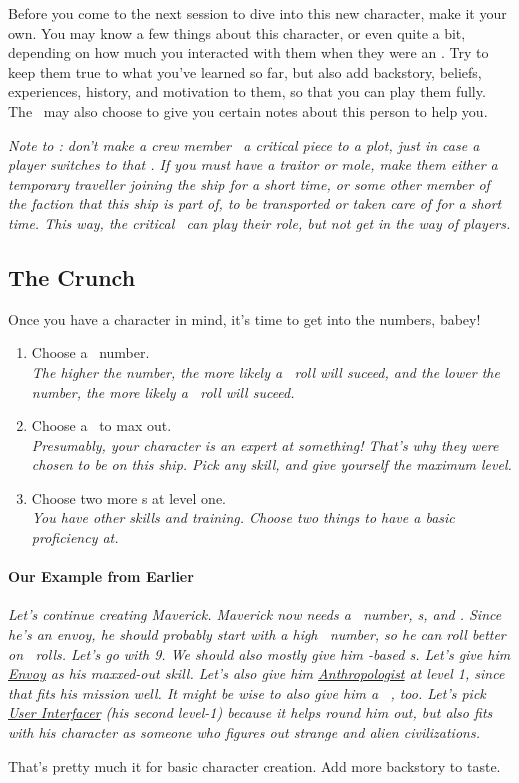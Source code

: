 \par
Before you come to the next session to dive into this new character, make it your own. You may know a few things about this character, or even quite a bit, depending on how much you interacted with them when they were an \npcShort. Try to keep them true to what you've learned so far, but also add backstory, beliefs, experiences, history, and motivation to them, so that you can play them fully. The \gm\, may also choose to give you certain notes about this person to help you.

\par
\textit{Note to \gm : don't make a crew member \npcShort\, a critical piece to a plot, just in case a player switches to that \npcShort . If you must have a traitor or mole, make them either a temporary traveller joining the ship for a short time, or some other member of the faction that this ship is part of, to be transported or taken care of for a short time. This way, the critical \npcShort\, can play their role, but not get in the way of players.}

\subsection{The Crunch}

\par
Once you have a character in mind, it's time to get into the numbers, babey!
\begin{enumerate}
	\item Choose a \both\, number. \\
		\textit{The higher the number, the more likely a \feelings\, roll will suceed, and the lower the number, the more likely a \lasers\, roll will suceed.}
	\item Choose a \skill\, to max out.\\
		\textit{Presumably, your character is an expert at something! That's why they were chosen to be on this ship. Pick any skill, and give yourself the maximum level.}
	\item Choose two more \skill s at level one. \\
		\textit{You have other skills and training. Choose two things to have a basic proficiency at.}
\end{enumerate}

\paragraph{Our Example from Earlier}
\textit{Let's continue creating Maverick. Maverick now needs a \both\, number, \skill s, and \abilityP . Since he's an envoy, he should probably start with a high \both\, number, so he can roll better on \feelings\, rolls. Let's go with 9. We should also mostly give him \feelings -based \skill s. Let's give him \hyperlink{SkillEnvoy}{Envoy} as his maxxed-out skill. Let's also give him \hyperlink{SkillAnthropologist}{Anthropologist} at level 1, since that fits his mission well. It might be wise to also give him a \lasers\, \skill , too. Let's pick \hyperlink{SkillUserInterfacer}{User Interfacer} (his second level-1) because it helps round him out, but also fits with his character as someone who figures out strange and alien civilizations.}

\par
That's pretty much it for basic character creation. Add more backstory to taste.